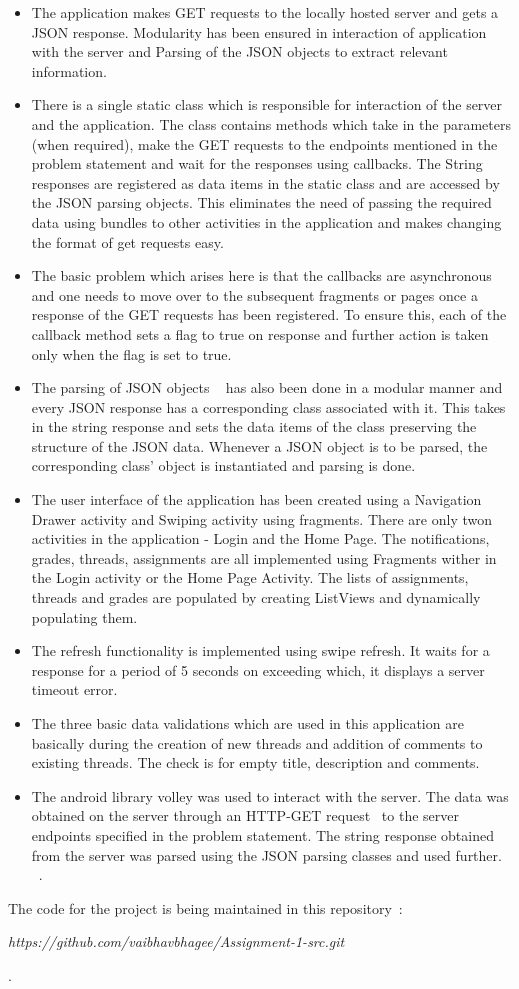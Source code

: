 \documentclass[12pt]{article}
\begin{document}
\begin{itemize}
\item The application makes GET requests to the locally hosted server and gets a JSON response. Modularity has been ensured in interaction of application with the server and Parsing of the JSON objects to extract relevant information.
\item There is a single static class which is responsible for interaction of the server and the application. The class contains methods which take in the parameters (when required), make the GET requests to the endpoints mentioned in the problem statement and wait for the responses using callbacks. The String responses are registered as data items in the static class and are accessed by the JSON parsing objects. This eliminates the need of passing the required data using bundles to other activities in the application and makes changing the format of get requests easy.
\item
The basic problem which arises here is that the callbacks are asynchronous and one needs to move over to the subsequent fragments or pages once a response of the GET requests has been registered. To ensure this, each of the callback method sets a flag to true on response and further action is taken only when the flag is set to true. 
\item The parsing of JSON objects {~\cite{json_parse}} has also been done in a modular manner and every JSON response has a corresponding class associated with it. This takes in the string response and sets the data items of the class preserving the structure of the JSON data. Whenever a JSON object is to be parsed, the corresponding class' object is instantiated and parsing is done.
\item The user interface of the application has been created using a Navigation Drawer activity and Swiping activity using fragments. There are only twon activities in the application - Login and the Home Page. The notifications, grades, threads, assignments are all implemented using Fragments wither in the Login activity or the Home Page Activity. The lists of assignments, threads and grades are populated by creating ListViews and dynamically populating them. 
\item The refresh functionality is implemented using swipe refresh. It waits for a response for a period of 5 seconds on exceeding which, it displays a server timeout error.
\item The three basic data validations which are used in this application are basically during the creation of new threads and addition of comments to existing threads. The check is for empty title, description and comments.
\item The android library volley was used to interact with the server. The data was obtained on the server through an HTTP-GET request~\cite{get_volley} to the server endpoints specified in the problem statement. The string response obtained from the server was parsed using the JSON parsing classes and used further.  
~\cite{android_network_tutorial}.
\end{itemize}

The code for the project is being maintained in this repository~\cite{git_tutorial}: \\\centerline{{\em https://github.com/vaibhavbhagee/Assignment-1-src.git}}.

\newpage


\medskip

\end{document}
